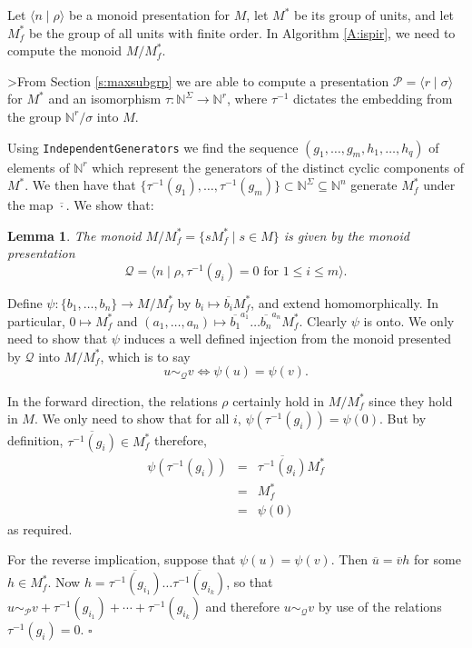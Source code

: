 \documentclass[12pt]{article}
\newtheorem{lemma}{\bf Lemma}
\newenvironment{proof}{{\it Proof.\/}}{$\square$\\}
\begin{document}
Let $\langle n \mid \rho \rangle$ be a monoid presentation for $M$,
let $M^*$ be its group of units, and let $M^*_f$ be the group of all units
with finite order. In Algorithm \ref{A:ispir}, we need to compute the
monoid $M/M^*_f$.

>From Section \ref{s:maxsubgrp} we are able to compute a presentation
$\mathcal{P} = \langle r \mid \sigma \rangle $ for $M^*$ and an isomorphism 
$\tau: \mathbb{N}^\Sigma \rightarrow \mathbb{N}^r$, where 
$\tau^{-1}$ dictates the embedding from the group $\mathbb{N}^r/\sigma$ 
into $M$.

Using {\tt IndependentGenerators}  we find the sequence
$(g_1, \ldots, g_m, h_1, \ldots, h_q)$ of elements of 
$\mathbb{N}^r$ which represent the generators of the distinct
cyclic components of $M^*$. We then have that 
$\{\tau^{-1}(g_1), \ldots, \tau^{-1}(g_m)\} \subset \mathbb{N}^\Sigma \subseteq
\mathbb{N}^n$ generate $M^*_f$ under the map $\overline{\cdot}$.
We show that:
\begin{lemma}\label{t:mgpres}
The monoid $M/M^*_f = \{sM^*_f \mid s \in M\}$ 
is given by the monoid presentation
$$\mathcal{Q} = \langle n \mid 
\rho, \tau^{-1}(g_i) = 0 \mbox{ for $1 \leq i \leq m$}\rangle.$$
\end{lemma}

\begin{proof}
Define $\psi : \{b_1, \ldots, b_n\}  \rightarrow M/M^*_f$ by
$b_i \mapsto \overline{b_i} M^*_f$, and extend homomorphically. 
In particular, $0 \mapsto M^*_f$ and
$(a_1, \ldots, a_n) \mapsto 
\overline{b_1}^{a_1} \ldots \overline{b_n}^{a_n} M^*_f$.
Clearly $\psi$ is onto.
We only need to show that $\psi$ induces a well defined injection from
the monoid presented by $\mathcal{Q}$ into $M/M^*_f$, which is to say
$$u \sim_\mathcal{Q} v \Leftrightarrow \psi(u) = \psi(v).$$

In the forward direction, the relations $\rho$ certainly hold in 
$M/M^*_f$ since they hold in $M$. We only need to show that 
for all $i$, $\psi(\tau^{-1}(g_i)) = \psi(0)$. But by definition,
$\overline{\tau^{-1}(g_i)} \in M^*_f$ therefore, 
\begin{eqnarray*}
\psi(\tau^{-1}(g_i))& = & \overline{\tau^{-1}(g_i)}M^*_f \\
		& = & M^*_f \\
		& = & \psi(0)
\end{eqnarray*}
as required.

For the reverse implication, suppose 
that $\psi(u) = \psi(v)$. Then
$\overline{u} = \overline{v} h$ for some $h \in M^*_f$.
Now $h = \overline{\tau^{-1}(g_{i_1})} \ldots \overline{\tau^{-1}(g_{i_k})}$,
so that 
$u \sim_\mathcal{P} v + \tau^{-1}(g_{i_1}) + \cdots + \tau^{-1}(g_{i_k})$
and therefore $u \sim_\mathcal{Q} v$ by use of the relations
$\tau^{-1}(g_{i}) = 0$.
\end{proof}
\end{document}
